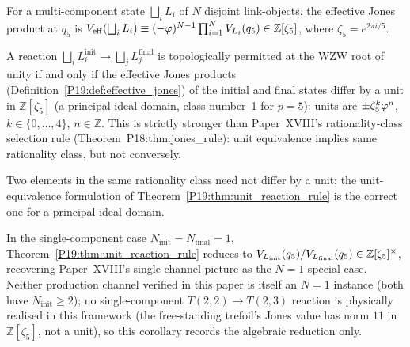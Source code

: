 \begin{definition}
\label{P19:def:effective_jones}
For a multi-component state $\bigsqcup_i L_i$ of $N$ disjoint
link-objects, the effective Jones product at $q_5$ is
$V_{\mathrm{eff}}(\bigsqcup_i L_i)\equiv
(-\varphi)^{N-1}\prod_{i=1}^NV_{L_i}(q_5)\in\mathbb Z[\zeta_5]$,
where $\zeta_5=e^{2\pi i/5}$.
\end{definition}

\begin{theorem}
\label{P19:thm:unit_reaction_rule}
A reaction $\bigsqcup_i L_i^{\mathrm{init}}\to
\bigsqcup_j L_j^{\mathrm{final}}$ is topologically permitted at the
WZW root of unity if and only if the effective Jones products
(Definition~\ref{P19:def:effective_jones}) of the initial and final
states differ by a unit in $\mathbb Z[\zeta_5]$ (a principal ideal
domain, class number~1 for $p=5$): units are
$\pm\zeta_5^k\varphi^n$, $k\in\{0,\ldots,4\}$, $n\in\mathbb Z$. This is
strictly stronger than Paper~XVIII's rationality-class selection rule
(Theorem~P18:thm:jones\_rule): unit equivalence implies same
rationality class, but not conversely.
\end{theorem}

\begin{remark}
\label{P19:rem:rationality_vs_unit}
Two elements in the same rationality class need not differ by a unit;
the unit-equivalence formulation of
Theorem~\ref{P19:thm:unit_reaction_rule} is the correct one for a
principal ideal domain.
\end{remark}

\begin{corollary}
\label{P19:cor:single_channel_recovery}
In the single-component case $N_{\mathrm{init}}=N_{\mathrm{final}}=1$,
Theorem~\ref{P19:thm:unit_reaction_rule} reduces to
$V_{L_{\mathrm{init}}}(q_5)/V_{L_{\mathrm{final}}}(q_5)\in
\mathbb Z[\zeta_5]^\times$, recovering Paper~XVIII's single-channel
picture as the $N=1$ special case. Neither production channel
verified in this paper is itself an $N=1$ instance (both have
$N_{\mathrm{init}}\geq2$); no single-component $T(2,2)\to T(2,3)$
reaction is physically realised in this framework (the free-standing
trefoil's Jones value has norm $11$ in $\mathbb Z[\zeta_5]$, not a
unit), so this corollary records the algebraic reduction only.
\end{corollary}


